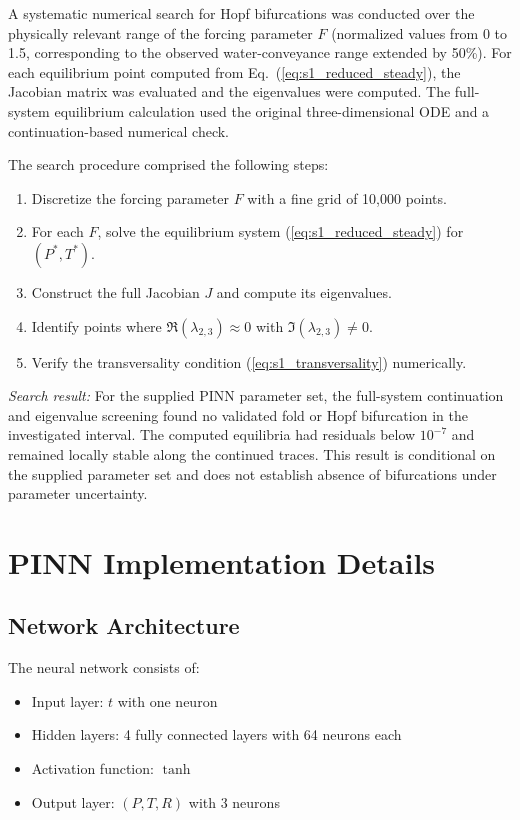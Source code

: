 \documentclass[12pt,a4paper]{article}
\begin{document}
A systematic numerical search for Hopf bifurcations was conducted over the physically relevant range of the forcing parameter $F$ (normalized values from 0 to 1.5, corresponding to the observed water-conveyance range extended by 50\%). For each equilibrium point computed from Eq.~(\ref{eq:s1_reduced_steady}), the Jacobian matrix was evaluated and the eigenvalues were computed. The full-system equilibrium calculation used the original three-dimensional ODE and a continuation-based numerical check.

The search procedure comprised the following steps:
\begin{enumerate}
	\item Discretize the forcing parameter $F$ with a fine grid of 10,000 points.
	\item For each $F$, solve the equilibrium system (\ref{eq:s1_reduced_steady}) for $(P^*, T^*)$.
	\item Construct the full Jacobian $J$ and compute its eigenvalues.
	\item Identify points where $\Re(\lambda_{2,3}) \approx 0$ with $\Im(\lambda_{2,3}) \neq 0$.
	\item Verify the transversality condition (\ref{eq:s1_transversality}) numerically.
\end{enumerate}

\emph{Search result:} For the supplied PINN parameter set, the full-system continuation and eigenvalue screening found no validated fold or Hopf bifurcation in the investigated interval. The computed equilibria had residuals below $10^{-7}$ and remained locally stable along the continued traces. This result is conditional on the supplied parameter set and does not establish absence of bifurcations under parameter uncertainty.

	\section{PINN Implementation Details}
	\label{sec:s2}
	
	\subsection{Network Architecture}
	
	The neural network consists of:
	\begin{itemize}
		\item Input layer: $t$ with one neuron
		\item Hidden layers: 4 fully connected layers with 64 neurons each
		\item Activation function: $\tanh$
		\item Output layer: $(P, T, R)$ with 3 neurons
	\end{itemize}
	
\end{document}
